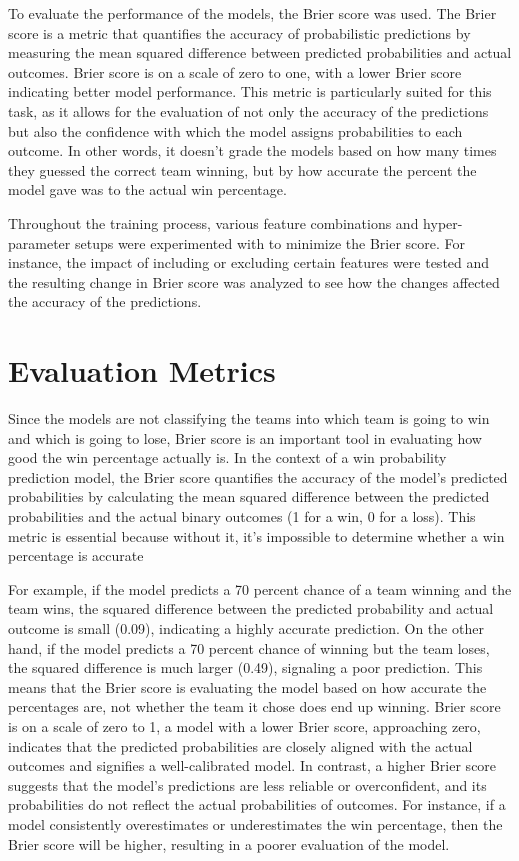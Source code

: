 \documentclass[10pt,twocolumn]{article}
\begin{document}
To evaluate the performance of the models, the Brier score was used. The Brier score is a metric that quantifies the accuracy of probabilistic predictions by measuring the mean squared difference between predicted probabilities and actual outcomes. Brier score is on a scale of zero to one, with a lower Brier score indicating better model performance. This metric is particularly suited for this task, as it allows for the evaluation of not only the accuracy of the predictions but also the confidence with which the model assigns probabilities to each outcome. In other words, it doesn’t grade the models based on how many times they guessed the correct team winning, but by how accurate the percent the model gave was to the actual win percentage.

Throughout the training process, various feature combinations and hyper-parameter setups were experimented with to minimize the Brier score. For instance, the impact of including or excluding certain features were tested and the resulting change in Brier score was analyzed to see how the changes affected the accuracy of the predictions.




\section{Evaluation Metrics}

Since the models are not classifying the teams into which team is going to win and which is going to lose, Brier score \cite{johansson2010genetic} is an important tool in evaluating how good the win percentage actually is. In the context of a win probability prediction model, the Brier score quantifies the accuracy of the model's predicted probabilities by calculating the mean squared difference between the predicted probabilities and the actual binary outcomes (1 for a win, 0 for a loss). This metric is essential because without it, it’s impossible to determine whether a win percentage is accurate

For example, if the model predicts a 70 percent chance of a team winning and the team wins, the squared difference between the predicted probability and actual outcome is small (0.09), indicating a highly accurate prediction. On the other hand, if the model predicts a 70 percent chance of winning but the team loses, the squared difference is much larger (0.49), signaling a poor prediction. This means that the Brier score is evaluating the model based on how accurate the percentages are, not whether the team it chose does end up winning.
Brier score is on a scale of zero to 1, a model with a lower Brier score, approaching zero, indicates that the predicted probabilities are closely aligned with the actual outcomes and signifies a well-calibrated model. In contrast, a higher Brier score suggests that the model’s predictions are less reliable or overconfident, and its probabilities do not reflect the actual probabilities of outcomes. For instance, if a model consistently overestimates or underestimates the win percentage, then the Brier score will be higher, resulting in a poorer evaluation of the model.
\end{document}
